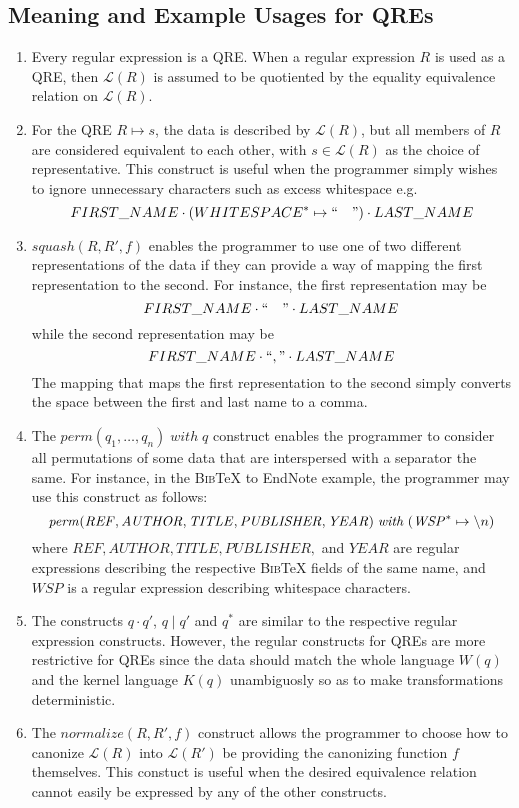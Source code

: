 \documentclass{svproc}
\newcommand{\re}[1]{\ensuremath{\mathit{#1}}}
\newcommand{\squash}[3]{\ensuremath{\mathit{squash}(#1, #2, #3)}}
\newcommand{\perm}[2]{\ensuremath{\mathit{perm}(#1)\; \mathit{with}\; #2}}
\newcommand{\normalize}[3]{\ensuremath{\mathit{normalize}(#1, #2, #3)}}
\newcommand{\sep}{\ensuremath{\; | \;}}
\begin{document}
  \subsection{Meaning and Example Usages for QREs}
  \begin{enumerate}
    \item 
    Every regular expression is a QRE. When a regular expression $R$ is used as
    a QRE, then $\mathcal{L}(R)$ is assumed to be quotiented by the equality
    equivalence relation on $\mathcal{L}(R)$.
    \item
    For the QRE $R \mapsto s$, the data is described by $\mathcal{L}(R)$, but
    all members of $R$ are considered equivalent to each other, with $s \in
    \mathcal{L}(R)$ as the choice of representative. This construct is useful
    when the programmer simply wishes to ignore unnecessary characters such as
    excess whitespace e.g. 
    $$FIRST\_NAME \cdot (WHITESPACE^* \mapsto `` \quad ") \cdot LAST\_NAME$$
    \item
    $\squash{R}{R'}{f}$ enables the programmer to use one of two different
    representations of the data if they can provide a way of mapping the first
    representation to the second. For instance, the first representation may be
    $$FIRST\_NAME \cdot `` \quad " \cdot LAST\_NAME$$
    while the second representation may be
    $$FIRST\_NAME \cdot ``," \cdot LAST\_NAME$$
    The mapping that maps the first representation to the second simply converts
    the space between the first and last name to a comma.
    \item
    The $\perm{q_1, \ldots, q_n}{q}$ construct enables the programmer to
    consider all permutations of some data that are interspersed with a
    separator the same. For instance, in the \textsc{Bib}\TeX{} to EndNote
    example, the programmer may use this construct as follows:
    $$\perm{\re{REF}, \re{AUTHOR}, \re{TITLE}, \re{PUBLISHER},
    \re{YEAR}}{(\re{WSP}^* \mapsto \string \n)}$$
 where $\re{REF}, \re{AUTHOR}, \re{TITLE}, \re{PUBLISHER},$ and $\re{YEAR}$ are
regular expressions describing the respective \textsc{Bib}\TeX\; fields of the
same name, and $WSP$ is a regular expression describing whitespace characters.
\item
The constructs $q \cdot q'$, $q \sep q'$ and $q^*$ are similar to the respective
regular expression constructs. However, the regular constructs for QREs are more
restrictive for QREs since the data should match the whole language $W(q)$ and
the kernel language $K(q)$ unambiguosly so as to make transformations
deterministic.
\item
The $\normalize{R}{R'}{f}$ construct allows the programmer to choose how to
canonize $\mathcal{L}(R)$ into $\mathcal{L}(R')$ be providing the canonizing
function $f$ themselves. This constuct is useful when the desired equivalence
relation cannot easily be expressed by any of the other constructs.
  \end{enumerate}
\end{document}
